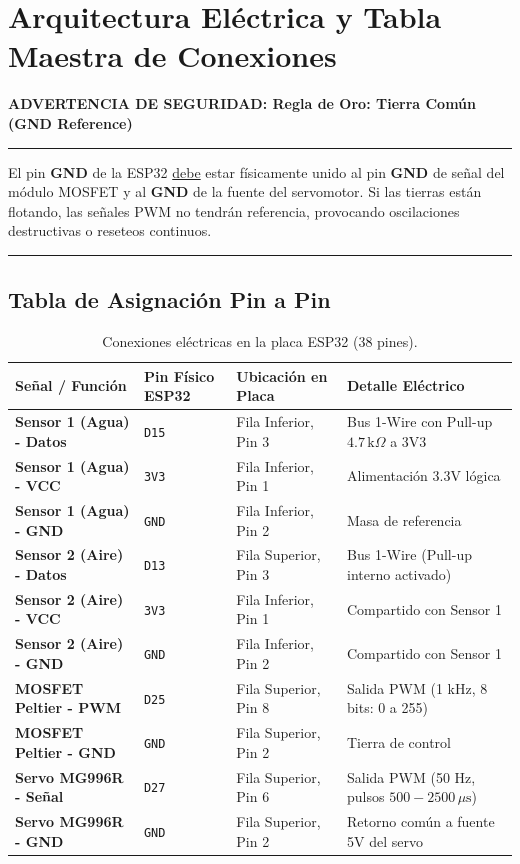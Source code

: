 \documentclass[11pt,letterpaper]{article}
\newenvironment{alertaBox}[1]{%
    \vspace{0.35cm}\noindent\textbf{\color{black}ADVERTENCIA DE SEGURIDAD: #1}\par\nopagebreak
    \vspace{2pt}\hrule height 0.8pt\vspace{4pt}\par\nopagebreak
    \small
}{%
    \par\vspace{4pt}\hrule height 0.4pt\vspace{0.35cm}
}
\begin{document}
\section{Arquitectura Eléctrica y Tabla Maestra de Conexiones}

\begin{alertaBox}{Regla de Oro: Tierra Común (GND Reference)}
El pin \textbf{GND} de la ESP32 \underline{debe} estar físicamente unido al pin \textbf{GND} de señal del módulo MOSFET y al \textbf{GND} de la fuente del servomotor. Si las tierras están flotando, las señales PWM no tendrán referencia, provocando oscilaciones destructivas o reseteos continuos.
\end{alertaBox}

\subsection{Tabla de Asignación Pin a Pin}

\begin{table}[h!]
\centering
\caption{Conexiones eléctricas en la placa ESP32 (38 pines).}
\label{tab:conexiones}
\begin{tabularx}{\textwidth}{@{}l l l L@{}}
\toprule
\textbf{Señal / Función} & \textbf{Pin Físico ESP32} & \textbf{Ubicación en Placa} & \textbf{Detalle Eléctrico} \\
\midrule
\textbf{Sensor 1 (Agua) - Datos} & \texttt{D15} & Fila Inferior, Pin 3 & Bus 1-Wire con Pull-up $4.7\,\text{k}\Omega$ a 3V3 \\
\textbf{Sensor 1 (Agua) - VCC} & \texttt{3V3} & Fila Inferior, Pin 1 & Alimentación 3.3V lógica \\
\textbf{Sensor 1 (Agua) - GND} & \texttt{GND} & Fila Inferior, Pin 2 & Masa de referencia \\
\midrule
\textbf{Sensor 2 (Aire) - Datos} & \texttt{D13} & Fila Superior, Pin 3 & Bus 1-Wire (Pull-up interno activado) \\
\textbf{Sensor 2 (Aire) - VCC} & \texttt{3V3} & Fila Inferior, Pin 1 & Compartido con Sensor 1 \\
\textbf{Sensor 2 (Aire) - GND} & \texttt{GND} & Fila Inferior, Pin 2 & Compartido con Sensor 1 \\
\midrule
\textbf{MOSFET Peltier - PWM} & \texttt{D25} & Fila Superior, Pin 8 & Salida PWM (1 kHz, 8 bits: 0 a 255) \\
\textbf{MOSFET Peltier - GND} & \texttt{GND} & Fila Superior, Pin 2 & Tierra de control \\
\midrule
\textbf{Servo MG996R - Señal} & \texttt{D27} & Fila Superior, Pin 6 & Salida PWM (50 Hz, pulsos $500 - 2500\,\mu\text{s}$) \\
\textbf{Servo MG996R - GND} & \texttt{GND} & Fila Superior, Pin 2 & Retorno común a fuente 5V del servo \\
\bottomrule
\end{tabularx}
\end{table}
\end{document}
